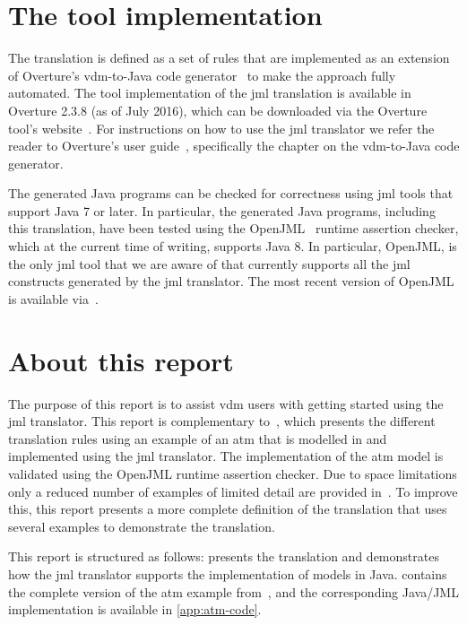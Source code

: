 \section{The tool implementation}

The translation is defined as a set of rules that are implemented as
an extension of Overture's \ac{vdm}-to-Java code
generator~\cite{Jorgensen&14a} to make the approach fully
automated. The tool implementation of the \ac{jml} translation is
available in Overture 2.3.8 (as of July 2016), which can be downloaded
via the Overture tool's website~\cite{OvertureWebsite}. For
instructions on how to use the \ac{jml} translator we refer the reader
to Overture's user guide~\cite{Larsen&10d}, specifically the chapter
on the \ac{vdm}-to-Java code generator.

The generated Java programs can be checked for correctness using
\ac{jml} tools that support Java 7 or later. In particular, the
generated Java programs, including this translation, have been tested
using the OpenJML~\cite{Cok&11} runtime assertion checker, which at
the current time of writing, supports Java 8. In particular, OpenJML,
is the only \ac{jml} tool that we are aware of that currently supports
all the \ac{jml} constructs generated by the \ac{jml} translator. The
most recent version of OpenJML is available via~\cite{OpenJMLWebsite}.

\section{About this report}

The purpose of this report is to assist \ac{vdm} users with getting
started using the \ac{jml} translator. This report is complementary
to~\cite{Jorgensen&16a}, which presents the different translation
rules using an example of an \ac{atm} that is modelled in \vsl and
implemented using the \ac{jml} translator. The implementation of the
\ac{atm} model is validated using the OpenJML runtime assertion
checker. Due to space limitations only a reduced number of examples of
limited detail are provided in~\cite{Jorgensen&16a}. To improve this,
this report presents a more complete definition of the translation
that uses several examples to demonstrate the translation.

This report is structured as follows:  presents the
translation and demonstrates how the \ac{jml} translator supports the
implementation of \vsl models in Java.  contains
the complete version of the \ac{atm} example
from~\cite{Jorgensen&16a}, and the corresponding Java/JML
implementation is available in \cref{app:atm-code}.

